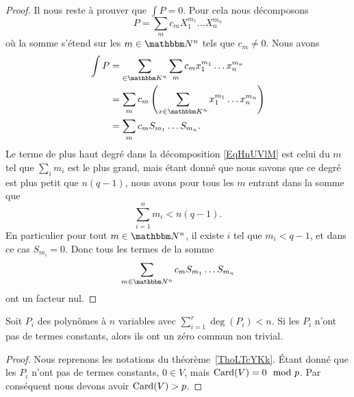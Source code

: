 \begin{proof}
    Il nous reste à prouver que \( \int P=0\). Pour cela nous décomposons
    \begin{equation}        \label{EqHnUVlM}
        P=\sum_m c_mX_1^{m_1}\ldots X_n^{m_n}
    \end{equation}
    où la somme s'étend sur les \( m\in \eN^n\) tels que \( c_m\neq 0\). Nous avons
    \begin{subequations}
        \begin{align}
            \int P&=\sum_{\in \eK^n}\sum_mc_m x_1^{m_1}\ldots x_n^{m_n}\\
            &=\sum_{m}c_m\left( \sum_{x\in \eK^n}x_1^{m_1}\ldots x_n^{m_n} \right)\\
            &=\sum_m c_m S_{m_1}\ldots S_{m_n}.
        \end{align}
    \end{subequations}
    Le terme de plus haut degré dans la décomposition \eqref{EqHnUVlM} est celui du \( m\) tel que \( \sum_im_i\) est le plus grand, mais étant donné que nous savons que ce degré est plus petit que \( n(q-1)\), nous avons pour tous les \( m\) entrant dans la somme que
    \begin{equation}
        \sum_{i=1}^nm_i<n(q-1).
    \end{equation}
    En particulier pour tout \( m\in \eN^n\), il existe \( i\) tel que \( m_i<q-1\), et dans ce cas \( S_{m_i}=0\). Donc tous les termes de la somme
    \begin{equation}
        \sum_{m\in \eN^n}c_mS_{m_1}\ldots S_{m_n}
    \end{equation}
    ont un facteur nul.
\end{proof}

\begin{corollary}       \label{CorfuHNKz}
    Soit \( P_i\) des polynômes à \( n\) variables avec \( \sum_{i=1}^r\deg(P_i)<n\). Si les \( P_i\) n'ont pas de termes constants, alors ils ont un zéro commun non trivial.
\end{corollary}

\begin{proof}
    Nous reprenons les notations du théorème~\ref{ThoLTcYKk}. Étant donné que les \( P_i\) n'ont pas de termes constants, \( 0\in V\), mais \( \operatorname{Card}(V)=0\mod p\). Par conséquent nous devons avoir \( \operatorname{Card}(V)>p\).
\end{proof}

